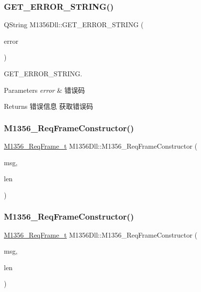 \subsubsection{\texorpdfstring{GET\_ERROR\_STRING()}{GET\_ERROR\_STRING()}\hspace{0.1cm}{\footnotesize\ttfamily [2/2]}}
{\footnotesize\ttfamily Q\+String M1356\+Dll\+::\+G\+E\+T\+\_\+\+E\+R\+R\+O\+R\+\_\+\+S\+T\+R\+I\+NG (\begin{DoxyParamCaption}\item[{Q\+String}]{error }\end{DoxyParamCaption})}



G\+E\+T\+\_\+\+E\+R\+R\+O\+R\+\_\+\+S\+T\+R\+I\+NG. 


\begin{DoxyParams}{Parameters}
{\em error} & 错误码 \\
\hline
\end{DoxyParams}
\begin{DoxyReturn}{Returns}
错误信息 获取错误码 
\end{DoxyReturn}
\mbox{\label{class_m1356_dll_a44099cd5f4bbdf9f37507eb7fa5477d6}} 
\subsubsection{\texorpdfstring{M1356\_ReqFrameConstructor()}{M1356\_ReqFrameConstructor()}\hspace{0.1cm}{\footnotesize\ttfamily [1/2]}}
{\footnotesize\ttfamily \mbox{\hyperlink{struct_m1356___req_frame__t}{M1356\+\_\+\+Req\+Frame\+\_\+t}} M1356\+Dll\+::\+M1356\+\_\+\+Req\+Frame\+Constructor (\begin{DoxyParamCaption}\item[{const char $\ast$}]{msg,  }\item[{int}]{len }\end{DoxyParamCaption})}

\mbox{\label{class_m1356_dll_a44099cd5f4bbdf9f37507eb7fa5477d6}} 
\subsubsection{\texorpdfstring{M1356\_ReqFrameConstructor()}{M1356\_ReqFrameConstructor()}\hspace{0.1cm}{\footnotesize\ttfamily [2/2]}}
{\footnotesize\ttfamily \mbox{\hyperlink{struct_m1356___req_frame__t}{M1356\+\_\+\+Req\+Frame\+\_\+t}} M1356\+Dll\+::\+M1356\+\_\+\+Req\+Frame\+Constructor (\begin{DoxyParamCaption}\item[{const char $\ast$}]{msg,  }\item[{int}]{len }\end{DoxyParamCaption})}

